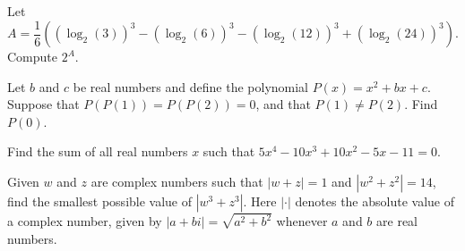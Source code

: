 %	




\begin{question}[name={2014 HMMT, Algebra, \href{https://artofproblemsolving.com/community/c129h577667p3406435}{Problem 3}}]
	Let\[ A = \frac{1}{6}((\log_2(3))^3-(\log_2(6))^3-(\log_2(12))^3+(\log_2(24))^3).\]
	Compute $2^A$.
\end{question}



%	



\begin{question}[name={2014 HMMT, Algebra, \href{https://artofproblemsolving.com/community/c129h577668p3406438}{Problem 4}}]
	Let $b$ and $c$ be real numbers and define the polynomial $P(x)=x^2+bx+c$. Suppose that $P(P(1))=P(P(2))=0$, and that $P(1) \neq P(2)$. Find $P(0)$.
\end{question}




%	




\begin{question}[name={2014 HMMT, Algebra, \href{https://artofproblemsolving.com/community/c129h577669p3406441}{Problem 5}}]
	Find the sum of all real numbers $x$ such that $5x^4-10x^3+10x^2-5x-11=0$.
\end{question}




%	




\begin{question}[name={2014 HMMT, Algebra, \href{https://artofproblemsolving.com/community/c129h577670p3406448}{Problem 6}}]
	Given $w$ and $z$ are complex numbers such that $|w+z|=1$ and $|w^2+z^2|=14$, find the smallest possible value of $|w^3+z^3|$. Here $| \cdot |$ denotes the absolute value of a complex number, given by $|a+bi|=\sqrt{a^2+b^2}$ whenever $a$ and $b$ are real numbers.
\end{question}




